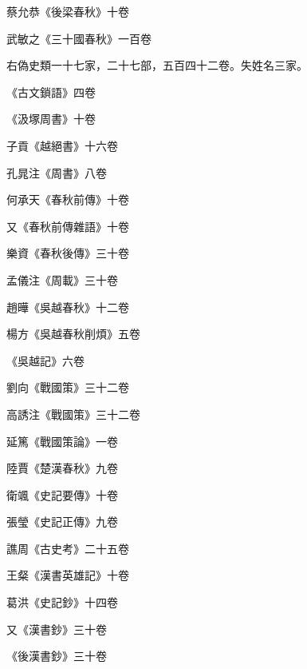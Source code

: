 \begin{pinyinscope}
 蔡允恭《後梁春秋》十卷



 武敏之《三十國春秋》一百卷



 右偽史類一十七家，二十七部，五百四十二卷。失姓名三家。



 《古文鎖語》四卷



 《汲塚周書》十卷



 子貢《越絕書》十六卷



 孔晁注《周書》八卷



 何承天《春秋前傳》十卷



 又《春秋前傳雜語》十卷



 樂資《春秋後傳》三十卷



 孟儀注《周載》三十卷



 趙曄《吳越春秋》十二卷



 楊方《吳越春秋削煩》五卷



 《吳越記》六卷



 劉向《戰國策》三十二卷



 高誘注《戰國策》三十二卷



 延篤《戰國策論》一卷



 陸賈《楚漢春秋》九卷



 衛颯《史記要傳》十卷



 張瑩《史記正傳》九卷



 譙周《古史考》二十五卷



 王粲《漢書英雄記》十卷



 葛洪《史記鈔》十四卷



 又《漢書鈔》三十卷



 《後漢書鈔》三十卷




\end{pinyinscope}
